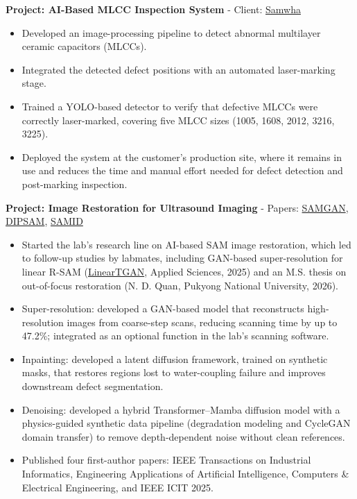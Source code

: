 \documentclass[a4paper,10pt]{extarticle}
\newenvironment{cvlist}{\begin{list}{}{%
  \setlength{\leftmargin}{0pt}\setlength{\itemindent}{0pt}%
  \setlength{\parsep}{0pt}\setlength{\itemsep}{4pt}\setlength{\topsep}{4pt}}}%
  {\end{list}}
\begin{document}
\begin{cvlist}
\begin{enumerate}[label={[\arabic*]}, leftmargin=*]
        \item \textbf{Project: AI-Based MLCC Inspection System} - Client: \href{https://www.samwha.co.kr/capacitor_eng/030205.asp}{Samwha}
        \begin{itemize}[leftmargin=*]
            \item Developed an image-processing pipeline to detect abnormal multilayer ceramic capacitors (MLCCs).
            \item Integrated the detected defect positions with an automated laser-marking stage.
            \item Trained a YOLO-based detector to verify that defective MLCCs were correctly laser-marked, covering five MLCC sizes (1005, 1608, 2012, 3216, 3225).
            \item Deployed the system at the customer's production site, where it remains in use and reduces the time and manual effort needed for defect detection and post-marking inspection.
        \end{itemize}
        \item \textbf{Project: Image Restoration for Ultrasound Imaging} - Papers: \href{https://www.sciencedirect.com/science/article/pii/S095219762502531X}{SAMGAN}, \href{https://www.sciencedirect.com/science/article/pii/S0045790626005677}{DIPSAM}, \href{https://ieeexplore.ieee.org/abstract/document/11354148}{SAMID}
        \begin{itemize}[leftmargin=*]
            \item Started the lab's research line on AI-based SAM image restoration, which led to follow-up studies by labmates, including GAN-based super-resolution for linear R-SAM (\href{https://www.mdpi.com/2076-3417/15/12/6780}{LinearTGAN}, Applied Sciences, 2025) and an M.S. thesis on out-of-focus restoration (N. D. Quan, Pukyong National University, 2026).
            \item Super-resolution: developed a GAN-based model that reconstructs high-resolution images from coarse-step scans, reducing scanning time by up to 47.2\%; integrated as an optional function in the lab's scanning software.
            \item Inpainting: developed a latent diffusion framework, trained on synthetic masks, that restores regions lost to water-coupling failure and improves downstream defect segmentation.
            \item Denoising: developed a hybrid Transformer--Mamba diffusion model with a physics-guided synthetic data pipeline (degradation modeling and CycleGAN domain transfer) to remove depth-dependent noise without clean references.
            \item Published four first-author papers: IEEE Transactions on Industrial Informatics, Engineering Applications of Artificial Intelligence, Computers \& Electrical Engineering, and IEEE ICIT 2025.
        \end{itemize}
    \end{enumerate}


\end{cvlist}
\end{document}
